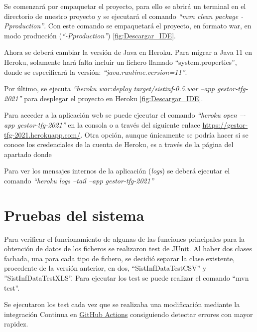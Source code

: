 Se comenzará por empaquetar el proyecto, para ello se abrirá un terminal en el directorio de nuestro proyecto y se ejecutará el comando \emph{``mvn clean package -Pproduction''}. Con este comando se empaquetará el proyecto, en formato war, en modo producción (\emph{``-Pproduction''}) \ref{fig:Descargar_IDE}.


Ahora se deberá cambiar la versión de Java en Heroku. Para migrar a Java 11 en Heroku, solamente hará falta incluir un fichero llamado ``system.properties'', donde se especificará la versión: \emph{``java.runtime.version=11''}.

Por último, se ejecuta \emph{``heroku war:deploy target/sistinf-0.5.war --app gestor-tfg-2021''} para desplegar el proyecto en Heroku \ref{fig:Descargar_IDE}. 


Para acceder a la aplicación web se puede ejecutar el comando \emph{“heroku open –-app gestor-tfg-2021”} en la consola o a través del siguiente enlace \href{https://gestor-tfg-2021.herokuapp.com/}{https://gestor-tfg-2021.herokuapp.com/}. Otra opción, aunque únicamente se podría hacer si se conoce los credenciales de la cuenta de Heroku, es a través de la página del apartado donde 

Para ver los mensajes internos de la aplicación (\emph{logs}) se deberá ejecutar el comando \emph{``heroku logs --tail --app gestor-tfg-2021''}

\section{Pruebas del sistema}

Para verificar el funcionamiento de algunas de las funciones principales para la obtención de datos de los ficheros se realizaron test de \href{https://junit.org/junit5/}{JUnit}. Al haber dos clases fachada, una para cada tipo de fichero, se decidió separar la clase existente, procedente de la versión anterior, en dos, ``SistInfDataTestCSV'' y ''SistInfDataTestXLS''. Para ejecutar los test se puede realizar el comando ``mvn test''.

Se ejecutaron los test cada vez que se realizaba una modificación mediante la integración Continua en \href{https://github.com/dbo1001/Gestor-TFG-2021/actions}{GitHub Actions} consiguiendo detectar errores con mayor rapidez.